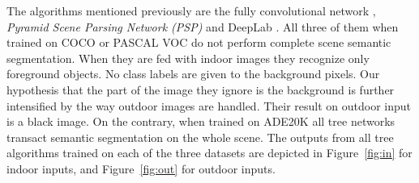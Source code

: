 \documentclass[12pt,a4paper,table,dvipsnames,tikz]{report}
\newcommand{\term}{\textit}
\newcommand{\acronym}{\MakeUppercase}
\newcommand{\bl}[1]{{\hypersetup{linkcolor=blue}#1}}
\begin{document}
	The algorithms mentioned previously are the fully convolutional network \citep{Long}, 
	\term{Pyramid Scene Parsing Network (\acronym{psp})} \citep{Zhao} and DeepLab \citep{Chen}. 
	All three of them when trained on \acronym{coco} or \acronym{pascal voc} do not perform 
	complete scene semantic segmentation. When they are fed with indoor images they recognize 
	only foreground objects. No class labels are given to the background pixels. Our 
	hypothesis that the part of the image they ignore is the background is further
	intensified by the way outdoor images are handled. Their result on outdoor input is 
	a black image. On the contrary, when trained on \acronym{ade20k} all tree networks 
	transact semantic segmentation on the whole scene. The outputs from all tree algorithms 
	trained on each of the three datasets are depicted in Figure~\bl{\ref{fig:in}} for indoor 
	inputs, and Figure~\bl{\ref{fig:out}} for outdoor inputs.
	\\
	
\end{document}
